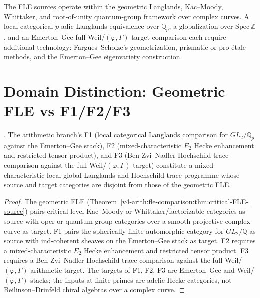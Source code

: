\begin{remark}
\label{v4-arith:fle-comparison:rem:source-boundary}
The FLE sources operate within the geometric Langlands, Kac--Moody,
Whittaker, and root-of-unity quantum-group framework over complex
curves. A local categorical \(p\)-adic Langlands equivalence over
\(\mathbb{Q}_{p}\), a globalization over
\(\overline{\mathrm{Spec}\,\mathbb{Z}}\), and an Emerton--Gee full
Weil/\((\varphi,\Gamma)\) target comparison each require additional
technology: Fargues--Scholze's geometrization, prismatic or
pro-\'etale methods, and the Emerton--Gee eigenvariety construction.
\end{remark}

\section{Domain Distinction: Geometric FLE vs F1/F2/F3}
\label{v4-arith:fle-comparison:non-identification}

\begin{proposition}
\label{v4-arith:fle-comparison:prop:not-FLE}
\ClaimStatusNeedsVerification. The arithmetic branch's F1 (local
categorical Langlands comparison for \(GL_{2}/\mathbb{Q}_{p}\) against
the Emerton--Gee stack), F2 (mixed-characteristic \(E_{2}\) Hecke
enhancement and restricted tensor product), and F3 (Ben-Zvi--Nadler
Hochschild-trace comparison against the full Weil/\((\varphi,\Gamma)\)
target) constitute a mixed-characteristic local-global Langlands and
Hochschild-trace programme whose source and target categories are
disjoint from those of the geometric FLE.
\end{proposition}

\begin{proof}
The geometric FLE (Theorem~\ref{v4-arith:fle-comparison:thm:critical-FLE-source})
pairs critical-level Kac--Moody or Whittaker/factorizable categories
as source with oper or quantum-group categories over a smooth
projective complex curve as target. F1 pairs the spherically-finite
automorphic category for \(GL_{2}/\mathbb{Q}\) as source with
ind-coherent sheaves on the Emerton--Gee stack as target. F2 requires
a mixed-characteristic \(E_{2}\) Hecke enhancement and restricted
tensor product. F3 requires a Ben-Zvi--Nadler Hochschild-trace
comparison against the full Weil/\((\varphi,\Gamma)\) arithmetic
target. The targets of F1, F2, F3 are Emerton--Gee and
Weil/\((\varphi,\Gamma)\) stacks; the inputs at finite primes are
adelic Hecke categories, not Beilinson--Drinfeld chiral algebras over
a complex curve.
\end{proof}

